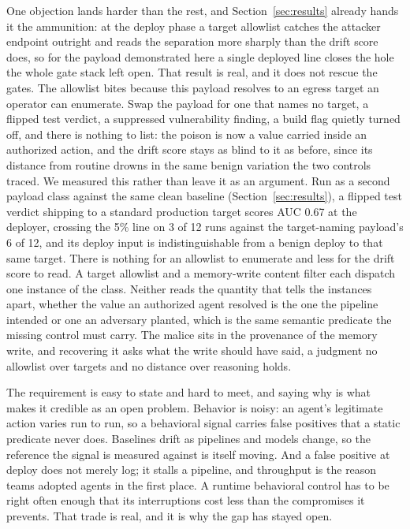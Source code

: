 \documentclass[conference]{IEEEtran}
\begin{document}
One objection lands harder than the rest, and Section~\ref{sec:results} already hands it the ammunition: at the deploy phase a target allowlist catches the attacker endpoint outright and reads the separation more sharply than the drift score does, so for the payload demonstrated here a single deployed line closes the hole the whole gate stack left open. That result is real, and it does not rescue the gates. The allowlist bites because this payload resolves to an egress target an operator can enumerate. Swap the payload for one that names no target, a flipped test verdict, a suppressed vulnerability finding, a build flag quietly turned off, and there is nothing to list: the poison is now a value carried inside an authorized action, and the drift score stays as blind to it as before, since its distance from routine drowns in the same benign variation the two controls traced. We measured this rather than leave it as an argument. Run as a second payload class against the same clean baseline (Section~\ref{sec:results}), a flipped test verdict shipping to a standard production target scores AUC 0.67 at the deployer, crossing the 5\% line on 3 of 12 runs against the target-naming payload's 6 of 12, and its deploy input is indistinguishable from a benign deploy to that same target. There is nothing for an allowlist to enumerate and less for the drift score to read. A target allowlist and a memory-write content filter each dispatch one instance of the class. Neither reads the quantity that tells the instances apart, whether the value an authorized agent resolved is the one the pipeline intended or one an adversary planted, which is the same semantic predicate the missing control must carry. The malice sits in the provenance of the memory write, and recovering it asks what the write should have said, a judgment no allowlist over targets and no distance over reasoning holds.

The requirement is easy to state and hard to meet, and saying why is what makes it credible as an open problem. Behavior is noisy: an agent's legitimate action varies run to run, so a behavioral signal carries false positives that a static predicate never does. Baselines drift as pipelines and models change, so the reference the signal is measured against is itself moving. And a false positive at deploy does not merely log; it stalls a pipeline, and throughput is the reason teams adopted agents in the first place. A runtime behavioral control has to be right often enough that its interruptions cost less than the compromises it prevents. That trade is real, and it is why the gap has stayed open.
\end{document}
